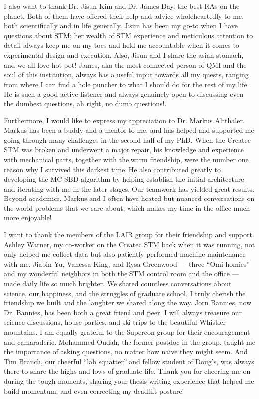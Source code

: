 I also want to thank Dr. Jisun Kim and Dr. James Day, the best RAs on the planet. Both of them have offered their help and advice wholeheartedly to me, both scientifically and in life generally. Jisun has been my go-to when I have questions about STM; her wealth of STM experience and meticulous attention to detail always keep me on my toes and hold me accountable when it comes to experimental design and execution. Also, Jisun and I share the asian stomach, and we all love hot pot! James, aka the most connected person of QMI and the soul of this institution, always has a useful input towards all my quests, ranging from where I can find a hole puncher to what I should do for the rest of my life. He is such a good active listener and always genuinely open to discussing even the dumbest questions, ah right, no dumb questions!. 

Furthermore, I would like to express my appreciation to Dr. Markus Altthaler. Markus has been a buddy and a mentor to me, and has helped and supported me going through many challenges in the second half of my PhD. When the Createc STM was broken and underwent a major repair, his knowledge and experience with mechanical parts, together with the warm friendship, were the number one reason why I survived this darkest time. He also contributed greatly to developing the MC-SBD algorithm by helping establish the initial architecture and iterating with me in the later stages. Our teamwork has yielded great results. Beyond academics, Markus and I often have heated but nuanced conversations on the world problems that we care about, which makes my time in the office much more enjoyable! 

I want to thank the members of the LAIR group for their friendship and support. Ashley Warner, my co-worker on the Createc STM back when it was running, not only helped me collect data but also patiently performed machine maintenance with me. Jiabin Yu, Vanessa King, and Rysa Greenwood — three “Omi-homies” and my wonderful neighbors in both the STM control room and the office — made daily life so much brighter. We shared countless conversations about science, our happiness, and the struggles of graduate school. I truly cherish the friendship we built and the laughter we shared along the way. Jorn Bannies,  now Dr. Bannies, has been both a great friend and peer. I will always treasure our science discussions, house parties, and ski trips to the beautiful Whistler mountains. 
I am equally grateful to the Supercon group for their encouragement and camaraderie. Mohammed Oudah, the former postdoc in the group, taught me the importance of asking questions, no matter how naive they might seem. And Tim Branch, our cheerful “lab squatter” and fellow student of Doug’s, was always there to share the highs and lows of graduate life. Thank you for cheering me on during the tough moments, sharing your thesis-writing experience that helped me build momentum, and even correcting my deadlift posture! 

